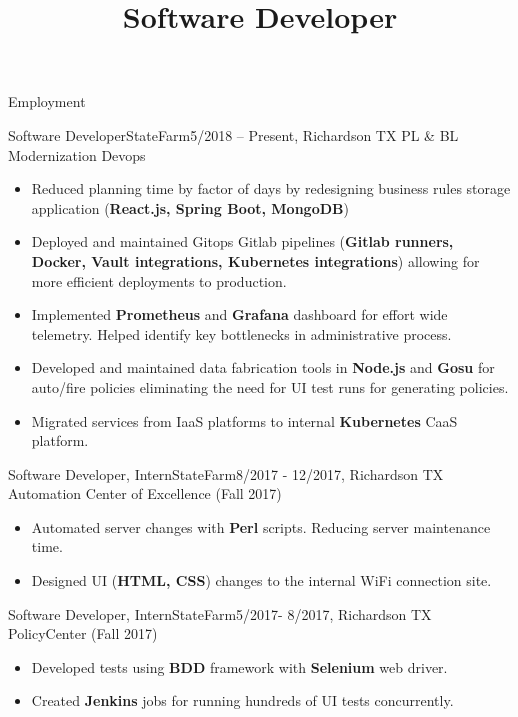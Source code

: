 \documentclass[]{lau}
\title{Software Developer}
\begin{document}
	\makeheader

	\begin{cvsection}{Employment}
		\begin{cvsubsection}{Software Developer}{StateFarm}{5/2018 – Present, Richardson TX}
			PL \& BL Modernization Devops
			\begin{itemize}
				\item Reduced planning time by factor of days by redesigning business rules storage application (\textbf{React.js, Spring Boot, MongoDB})
				\item Deployed and maintained Gitops Gitlab pipelines (\textbf{Gitlab runners, Docker, Vault integrations, Kubernetes integrations}) allowing for more efficient deployments to production.
				\item Implemented \textbf{Prometheus} and \textbf{Grafana} dashboard for effort wide telemetry. Helped identify key bottlenecks in administrative process.
				\item Developed and maintained data fabrication tools in \textbf{Node.js} and \textbf{Gosu} for auto/fire policies eliminating the need for UI test runs for generating policies.
				\item Migrated services from IaaS platforms to internal \textbf{Kubernetes} CaaS platform.
			\end{itemize}
		\end{cvsubsection}

		\begin{cvsubsection}{Software Developer, Intern}{StateFarm}{8/2017 - 12/2017, Richardson TX}
			Automation Center of Excellence (Fall 2017)
			\begin{itemize}
				\item Automated server changes with \textbf{Perl} scripts. Reducing server maintenance time.
				\item Designed UI (\textbf{HTML, CSS}) changes to the internal WiFi connection site.
			\end{itemize}
		\end{cvsubsection}

		\begin{cvsubsection}{Software Developer, Intern}{StateFarm}{5/2017- 8/2017, Richardson TX}
			PolicyCenter (Fall 2017)
			\begin{itemize}
				\item Developed tests using \textbf{BDD} framework with \textbf{Selenium} web driver.
				\item Created \textbf{Jenkins} jobs for running hundreds of UI tests concurrently.
			\end{itemize}
		\end{cvsubsection}
	\end{cvsection}
\end{document}
